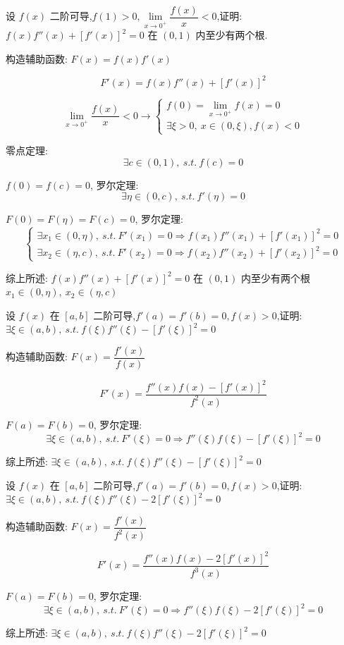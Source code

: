 \begin{proposition}
	设 $f(x)$ 二阶可导,$f(1)> 0,\lim\limits_{x\to 0^{+}}\dfrac{f(x)}{x}<0$,证明: $f(x)f''(x)+[f'(x)]^2=0$ 在 $(0,1)$ 内至少有两个根.
\end{proposition}
\begin{solution}

	构造辅助函数: $F(x)=f(x)f'(x)$

	$$F'(x)=f(x)f''(x)+[f'(x)]^2$$

	
	$$ \lim\limits_{x\to 0^{+}}\dfrac{f(x)}{x}<0\to
	\begin{cases}
		f(0)=\lim\limits_{x\to 0^{+}}f(x)=0 \\
		\exists\xi>0,\ x\in(0,\xi),f(x)<0
	\end{cases}
	$$

	零点定理:
	$$\exists c\in(0,1),\ s.t.\ f(c)=0$$

	$f(0) = f(c) = 0$, 罗尔定理:
	$$\exists\eta\in(0,c),\ s.t.\ f'(\eta)=0$$



	$F(0) = F(\eta) = F(c) = 0$, 罗尔定理:
	$$\begin{cases}
		\exists x_{1}\in(0,\eta),\ s.t.\ F'(x_{1})=0\Rightarrow f(x_{1})f''(x_{1})+[f'(x_{1})]^2=0 \\
		\exists x_{2}\in(\eta,c),\ s.t.\ F'(x_{2})=0\Rightarrow f(x_{2})f''(x_{2})+[f'(x_{2})]^2=0
	\end{cases}$$

	综上所述: $f(x)f''(x)+[f'(x)]^2=0$ 在 $(0,1)$ 内至少有两个根 $x_{1}\in(0,\eta),\ x_{2}\in(\eta,c)$
\end{solution}

\begin{proposition}
	设 $f(x)$ 在 $[a,b]$ 二阶可导,$f'(a)=f'(b)=0,f(x)>0$,证明: $\exists \xi\in(a,b),\ s.t.\ f(\xi)f''(\xi)-[f'(\xi)]^2=0$
\end{proposition}
\begin{solution}

	构造辅助函数: $F(x)=\dfrac{f'(x)}{f(x)}$

	$$F'(x)=\dfrac{f''(x)f(x)-[f'(x)]^2}{f^{2}(x)}$$

	$F(a) = F(b) = 0$, 罗尔定理:
	$$\exists \xi\in(a,b),\ s.t.\ F'(\xi)=0\Rightarrow f''(\xi)f(\xi)-[f'(\xi)]^2=0$$

	综上所述: $\exists \xi\in(a,b),\ s.t.\ f(\xi)f''(\xi)-[f'(\xi)]^2=0$
\end{solution}

\begin{proposition}
	设 $f(x)$ 在 $[a,b]$ 二阶可导,$f'(a)=f'(b)=0,f(x)>0$,证明: $\exists \xi\in(a,b),\ s.t.\ f(\xi)f''(\xi)-2[f'(\xi)]^2=0$
\end{proposition}
\begin{solution}

	构造辅助函数: $F(x)=\dfrac{f'(x)}{f^{2}(x)}$

	$$F'(x)=\dfrac{f''(x)f(x)-2[f'(x)]^2}{f^{3}(x)}$$

	$F(a) = F(b) = 0$, 罗尔定理:
	$$\exists \xi\in(a,b),\ s.t.\ F'(\xi)=0\Rightarrow f''(\xi)f(\xi)-2[f'(\xi)]^2=0$$

	综上所述: $\exists \xi\in(a,b),\ s.t.\ f(\xi)f''(\xi)-2[f'(\xi)]^2=0$
\end{solution}

